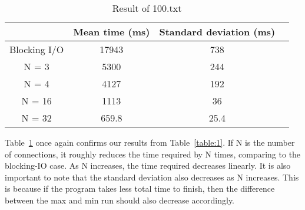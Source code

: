 \documentclass[12pt]{article}
\begin{document}
    \begin{table}[H]
        \centering
        \begin{tabular}{|c|c|c|c|}
            \hline
            & Mean time (ms) & Standard deviation (ms) \\ [0.5ex]
            \hline
            Blocking I/O & 17943 & 738 \\
            \hline
            N = 3 & 5300 & 244 \\
            \hline
            N = 4 & 4127 & 192 \\
            \hline
            N = 16 & 1113 & 36 \\
            \hline
            N = 32 & 659.8 & 25.4 \\
            \hline
        \end{tabular}
        \caption{Result of 100.txt}
        \label{table:2}
    \end{table}

    Table~\ref{table:2} once again confirms our results from Table~\ref{table:1}.
    If N is the number of connections, it roughly reduces the time required by N times, comparing to the blocking-IO case.
    As N increases, the time required decreases linearly.
    It is also important to note that the standard deviation also decreases as N increases.
    This is because if the program takes less total time to finish, then the difference between the max and min run should also decrease accordingly.
\end{document}

